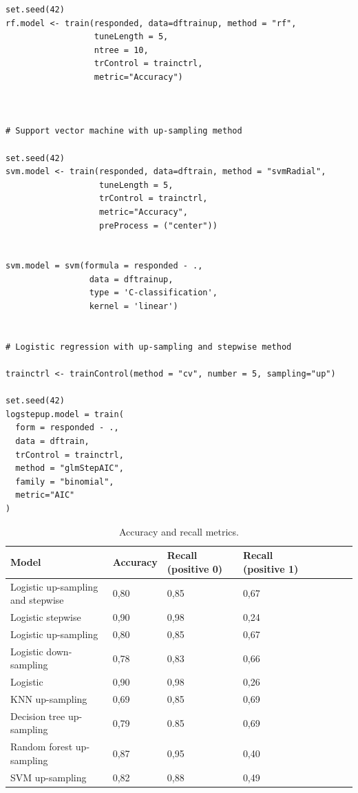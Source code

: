 \documentclass[12pt,]{article}
\begin{document}
\begin{lstlisting}[frame=single,framerule=0pt,framesep=8pt, basicstyle=\tiny]
set.seed(42)
rf.model <- train(responded, data=dftrainup, method = "rf", 
                  tuneLength = 5,
                  ntree = 10,
                  trControl = trainctrl,
                  metric="Accuracy")



# Support vector machine with up-sampling method

set.seed(42)
svm.model <- train(responded, data=dftrain, method = "svmRadial", 
                   tuneLength = 5,
                   trControl = trainctrl,
                   metric="Accuracy",
                   preProcess = ("center"))


svm.model = svm(formula = responded - .,
                 data = dftrainup,
                 type = 'C-classification',
                 kernel = 'linear')


# Logistic regression with up-sampling and stepwise method

trainctrl <- trainControl(method = "cv", number = 5, sampling="up")

set.seed(42)
logstepup.model = train(
  form = responded - .,
  data = dftrain,
  trControl = trainctrl,
  method = "glmStepAIC",
  family = "binomial", 
  metric="AIC"
)

\end{lstlisting}

\begin{table}[H]
\caption{\label{tab:}Accuracy and recall metrics.}
\centering
\fontsize{11}{13}\selectfont
\begin{tabular}[t]{llllllll}
\toprule
 Model & Accuracy & Recall (positive 0) & Recall (positive 1)  \\
 \midrule
Logistic up-sampling and stepwise & 0,80 & 0,85 & 0,67 &  \\
Logistic stepwise & 0,90 & 0,98 & 0,24 &  \\
Logistic up-sampling & 0,80  &  0,85 & 0,67 &  \\
Logistic down-sampling & 0,78 & 0,83 & 0,66 & \\
Logistic & 0,90 & 0,98  & 0,26 &  \\
KNN up-sampling & 0,69 & 0,85  & 0,69 &  \\
Decision tree up-sampling & 0,79 & 0.85 & 0,69 &  \\
Random forest up-sampling & 0,87 & 0,95 & 0,40 &  \\
SVM up-sampling & 0,82 & 0,88 & 0,49 &  \\
\bottomrule
\end{tabular}
\end{table}
\end{document}
